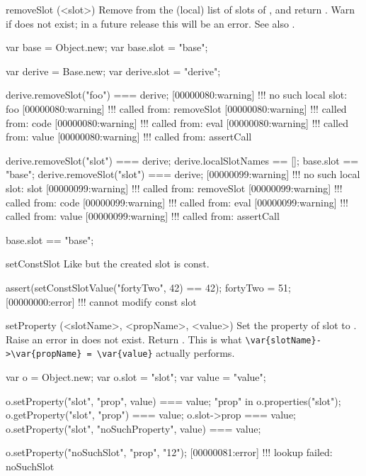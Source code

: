 \begin{urbiscriptapi}
\item[removeSlot](<slot>)%
  Remove  from the (local) list of slots of \this, and return
  \this.  Warn if  does not exist; in a future release this will
  be an error.  See also .
\begin{urbiassert}
var base = Object.new;
var base.slot = "base";

var derive = Base.new;
var derive.slot = "derive";

derive.removeSlot("foo") === derive;
[00000080:warning] !!! no such local slot: foo
[00000080:warning] !!!    called from: removeSlot
[00000080:warning] !!!    called from: code
[00000080:warning] !!!    called from: eval
[00000080:warning] !!!    called from: value
[00000080:warning] !!!    called from: assertCall

derive.removeSlot("slot") === derive;
derive.localSlotNames == [];
base.slot == "base";
derive.removeSlot("slot") === derive;
[00000099:warning] !!! no such local slot: slot
[00000099:warning] !!!    called from: removeSlot
[00000099:warning] !!!    called from: code
[00000099:warning] !!!    called from: eval
[00000099:warning] !!!    called from: value
[00000099:warning] !!!    called from: assertCall

base.slot == "base";
\end{urbiassert}


\item[setConstSlot]%
  Like  but the created slot is const.
\begin{urbiscript}
assert(setConstSlotValue("fortyTwo", 42) == 42);
fortyTwo = 51;
[00000000:error] !!! cannot modify const slot
\end{urbiscript}


\item[setProperty](<slotName>, <propName>, <value>)%
  Set the property  of slot  to .
  Raise an error in  does not exist.  Return .
  This is what \lstinline|\var{slotName}->\var{propName} = \var{value}|
  actually performs.
\begin{urbiassert}
var o = Object.new;
var o.slot = "slot";
var value = "value";

o.setProperty("slot", "prop", value) === value;
"prop" in o.properties("slot");
o.getProperty("slot", "prop") === value;
o.slot->prop === value;
o.setProperty("slot", "noSuchProperty", value) === value;

o.setProperty("noSuchSlot", "prop", "12");
[00000081:error] !!! lookup failed: noSuchSlot
\end{urbiassert}


\end{urbiscriptapi}
